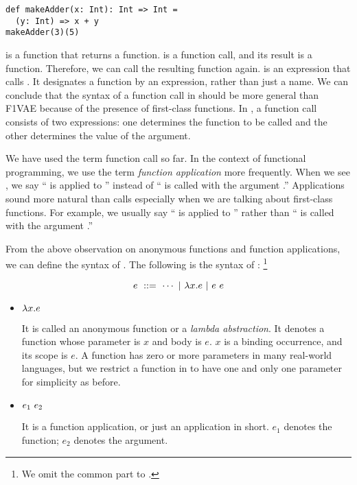 \begin{verbatim}
def makeAdder(x: Int): Int => Int =
  (y: Int) => x + y
makeAdder(3)(5)
\end{verbatim}

 is a function that returns a function.  is a
function call, and its result is a function. Therefore, we can call the
resulting function again.  is an expression that calls
. It designates a function by an expression, rather than just
a name. We can conclude that the syntax of a function call in \Lang should be
more general than \textsf{F1VAE} because of the presence of first-class
functions. In \Lang, a function call consists of two expressions: one determines
the function to be called and the other determines the value of the argument.

We have used the term function call so far. In the context of functional
programming, we use the term \textit{function application} more frequently. When we see , we say `` is
applied to '' instead of `` is called with the argument
.'' Applications sound more natural than calls especially when we are
talking about first-class functions. For example, we usually say
`` is applied to '' rather than ``
is called with the argument .''

From the above observation on anonymous functions and function applications,
we can define the syntax of \Lang. The following is the syntax of \Lang:
\footnote{We omit the common part to \plang.}

\[ e\ ::=\ \cdots\ |\ \efun{x}{e}\ |\ \eapp{e}{e} \]

\begin{itemize}
  \item $\lambda x.e$

    It is called an anonymous function or a \textit{lambda abstraction}.
    It denotes a function whose parameter is $x$ and body is $e$. $x$ is a
    binding occurrence, and its scope is $e$.
    A function has zero or more parameters in many real-world languages,
    but we restrict a function in \Lang to have one and only one parameter for
    simplicity as before.

  \item $e_1\ e_2$

    It is a function application, or just an application in short.
    $e_1$ denotes the function; $e_2$ denotes the argument.
\end{itemize}

